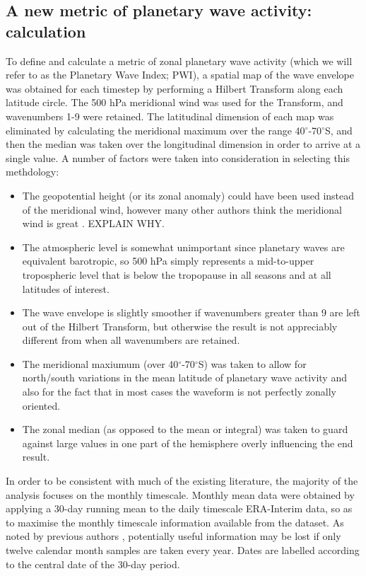 \subsection{A new metric of planetary wave activity: calculation}

To define and calculate a metric of zonal planetary wave activity (which we will refer to as the Planetary Wave Index; PWI), a spatial map of the wave envelope was obtained for each timestep by performing a Hilbert Transform along each latitude circle. The 500 hPa meridional wind was used for the Transform, and wavenumbers 1-9 were retained. The latitudinal dimension of each map was eliminated by calculating the meridional maximum over the range 40$^{\circ}$-70$^{\circ}$S, and then the median was taken over the longitudinal dimension in order to arrive at a single value. A number of factors were taken into consideration in selecting this methdology:
\begin{itemize}
\item The geopotential height (or its zonal anomaly) could have been used instead of the meridional wind, however many other authors think the meridional wind is great \citep[e.g.]{Hope2014}. EXPLAIN WHY.
\item The atmospheric level is somewhat unimportant since planetary waves are equivalent barotropic, so 500 hPa simply represents a mid-to-upper tropospheric level that is below the tropopause in all seasons and at all latitudes of interest.
\item The wave envelope is slightly smoother if wavenumbers greater than 9 are left out of the Hilbert Transform, but otherwise the result is not appreciably different from when all wavenumbers are retained.
\item The meridional maxiumum (over 40$^{\circ}$-70$^{\circ}$S) was taken to allow for north/south variations in the mean latitude of planetary wave activity and also for the fact that in most cases the waveform is not perfectly zonally oriented. 
\item The zonal median (as opposed to the mean or integral) was taken to guard against large values in one part of the hemisphere overly influencing the end result.
\end{itemize}

In order to be consistent with much of the existing literature, the majority of the analysis focuses on the monthly timescale. Monthly mean data were obtained by applying a 30-day running mean to the daily timescale ERA-Interim data, so as to maximise the monthly timescale information available from the dataset. As noted by previous authors \citep[e.g.][]{Kidson1988}, potentially useful information may be lost if only twelve calendar month samples are taken every year. Dates are labelled according to the central date of the 30-day period.   